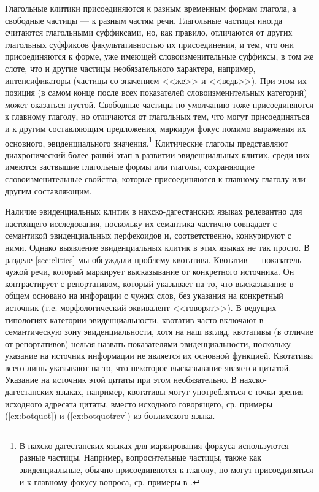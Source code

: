 Глагольные клитики присоединяются к разным временным формам глагола, а свободные частицы --- к разным частям речи. Глагольные частицы иногда считаются глагольными суффиксами, но, как правило, отличаются от других глагольных суффиксов факультативностью их присоединения, и тем, что они присоединяются к форме, уже имеющей словоизменительные суффиксы, в том же слоте, что и другие частицы необязательного характера, например, интенсификаторы (частицы со значением <<же>> и <<ведь>>). При этом их позиция (в самом конце после всех показателей словоизменительных категорий) может оказаться пустой. Свободные частицы по умолчанию тоже присоединяются к главному глаголу, но отличаются от глагольных тем, что могут присоединяться и к другим составляющим предложения, маркируя фокус помимо выражения их основного, эвиденциального значения.\footnote{В нахско-дагестанских языках для маркирования форкуса используются разные частицы. Например, вопросительные частицы, также как эвиденциальные, обычно присоединяются к глаголу, но могут присоединяться и к главному фокусу вопроса, ср. примеры в \citep[253--254]{belyaevforker2016}.} Клитические глаголы представляют диахронический более раний этап в развитии эвиденциальных клитик, среди них имеются заствышие глагольные формы или глаголы, сохраняющие словоизменительные свойства, которые присоединяются к главному глаголу или другим составляющим.
\par Наличие эвиденциальных клитик в нахско-дагестанских языках релевантно для настоящего исследования, поскольку их семантика частично совпадает с семантикой эвиденциальных перфекоидов и, соответственно, конкурируют с ними. Однако выявление эвиденциальных клитик в этих языках не так просто. В разделе \ref{sec:clitics} мы обсуждали проблему квотатива. Квотатив --- показатель чужой речи, который маркирует высказывание от конкретного источника. Он контрастирует с репортативом, который указывает на то, что высказывание в общем основано на инфорации с чужих слов, без указания на конкретный источник (т.е. морфологический эквивалент <<говорят>>). В ведущих типологиях категории эвиденциальности, квотатив часто включают в семантическую зону эвиденциальности, хотя на наш взгляд, квотативы (в отличие от репортативов) нельзя назвать показателями эвиденциальности, поскольку указание на источник информации не является их основной функцией. Квотативы всего лишь указывают на то, что некоторое высказывание является цитатой. Указание на источник этой цитаты при этом необязательно. В нахско-дагестанских языках, например, квотативы могут употребляться с точки зрения исходного адресата цитаты, вместо исходного говорящего, ср. примеры (\ref{ex:botquot}) и (\ref{ex:botquotrev}) из ботлихского языка.

